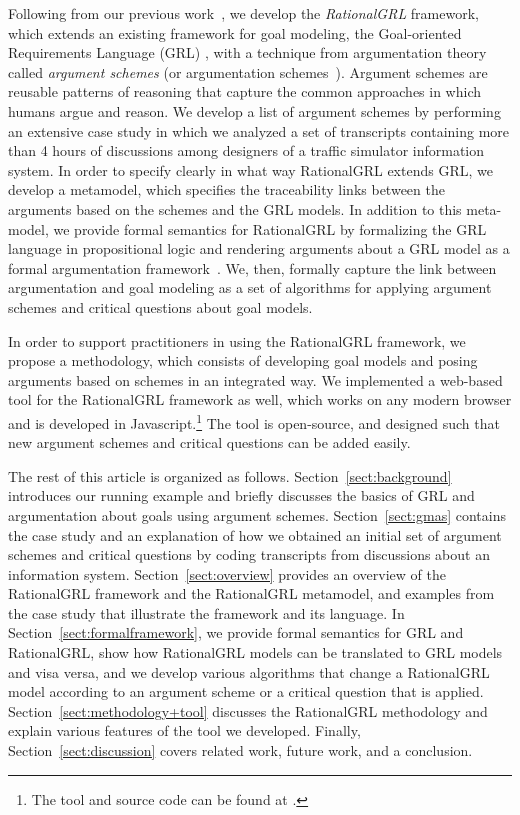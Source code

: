 Following from our previous work~\cite{vanzee-etal:renext2015,vanZee-etal:er2016}, we develop the \emph{RationalGRL} framework, which extends an existing framework for goal modeling, the Goal-oriented Requirements Language (GRL) \cite{Amyot:2010:EGM:1841349.1841356}, with a technique from argumentation theory called \emph{argument schemes} (or argumentation schemes~\cite{walton-etal2008}). Argument schemes are reusable patterns of reasoning that capture the common approaches in which humans argue and reason. We develop a list of argument schemes by performing an extensive case study in which we analyzed a set of transcripts containing more than 4 hours of discussions among designers of a traffic simulator information system. In order to specify clearly in what way RationalGRL extends GRL, we develop a metamodel, which specifies the traceability links between the arguments based on the schemes and the GRL models. In addition to this meta-model, we provide formal semantics for RationalGRL by formalizing the GRL language in propositional logic and rendering arguments about a GRL model as a formal argumentation framework~\cite{Dung1995}. We, then, formally capture the link between argumentation and goal modeling as a set of algorithms for applying argument schemes and critical questions about goal models. 

In order to support practitioners in using the RationalGRL framework, we propose a methodology, which consists of developing goal models and posing arguments based on schemes in an integrated way. We  implemented a web-based tool for the RationalGRL framework as well, which works on any modern browser and is developed in Javascript.\footnote{The tool and source code can be found at \rationalgrlurl.} The tool is open-source, and designed such that new argument schemes and critical questions can be added easily.

The rest of this article is organized as follows. Section~\ref{sect:background} introduces our running example and briefly discusses the basics of GRL and argumentation about goals using argument schemes. Section~\ref{sect:gmas} contains the case study and an explanation of how we obtained an initial set of argument schemes and critical questions by coding transcripts from discussions about an information system. Section~\ref{sect:overview} provides an overview of the RationalGRL framework and the RationalGRL metamodel, and examples from the case study that illustrate the framework and its language. In Section~\ref{sect:formalframework}, we provide formal semantics for GRL and RationalGRL, show how RationalGRL models can be translated to GRL models and visa versa, and we develop various algorithms that change a RationalGRL model according to an argument scheme or a critical question that is applied. Section~\ref{sect:methodology+tool} discusses the RationalGRL methodology and explain various features of the tool we developed. Finally, Section~\ref{sect:discussion} covers related work, future work, and a conclusion.